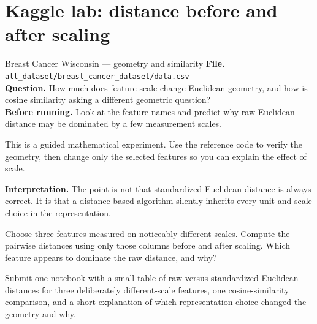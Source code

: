 \section{Kaggle lab: distance before and after scaling}
\label{sec:kaggle-breast-geometry}

\begin{kaggleproject}{Breast Cancer Wisconsin --- geometry and similarity}
\textbf{File.} \texttt{all\_dataset/breast\_cancer\_dataset/data.csv}\\
\textbf{Question.} How much does feature scale change Euclidean geometry, and how is cosine similarity asking a different geometric question?\\
\textbf{Before running.} Look at the feature names and predict why raw Euclidean distance may be dominated by a few measurement scales.

\begin{labmode}
This is a guided mathematical experiment. Use the reference code to verify the geometry, then change only the selected features so you can explain the effect of scale.
\end{labmode}



\textbf{Interpretation.} The point is not that standardized Euclidean distance is always correct. It is that a distance-based algorithm silently inherits every unit and scale choice in the representation.

\begin{tryit}
Choose three features measured on noticeably different scales. Compute the pairwise distances using only those columns before and after scaling. Which feature appears to dominate the raw distance, and why?
\end{tryit}
\end{kaggleproject}

\begin{labdeliverable}
Submit one notebook with a small table of raw versus standardized Euclidean distances for three deliberately different-scale features, one cosine-similarity comparison, and a short explanation of which representation choice changed the geometry and why.
\end{labdeliverable}
